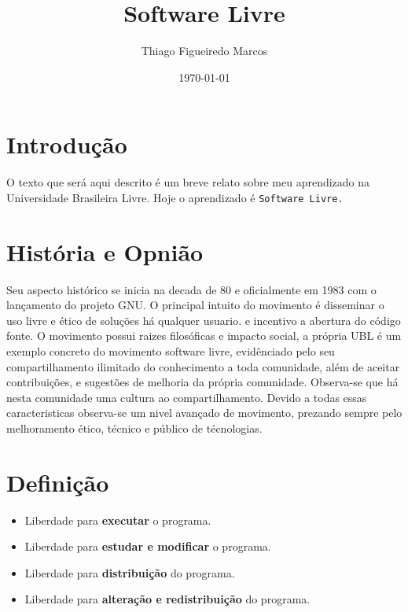 \documentclass[12pt, onecolumn]{report}
\title{Software Livre}
\author{Thiago Figueiredo Marcos}
\date{\today}
\begin{document}
    \maketitle

    \tableofcontents

    \chapter{Introdução}
        \hspace{2cm} O texto que será aqui descrito é um breve relato sobre meu aprendizado na Universidade Brasileira Livre.
            Hoje o aprendizado é {\tt Software Livre.}

    \chapter{História e Opnião}
        \hspace{2cm} Seu aspecto histórico se inicia na decada de 80 e oficialmente em 1983 com o lançamento do projeto GNU.
            O principal intuito do movimento é disseminar o uso livre e ético de soluções há qualquer usuario. 
            e incentivo a abertura do código fonte. O movimento possui raizes filosóficas e impacto social, a própria UBL é um 
            exemplo concreto do movimento software livre, evidênciado pelo seu compartilhamento ilimitado do conhecimento a toda comunidade,
            além de aceitar contribuições, e sugestões de melhoria da própria comunidade. Observa-se que há nesta comunidade uma cultura ao compartilhamento.
            Devido a todas essas caracteristicas observa-se um nivel avançado de movimento, prezando sempre pelo melhoramento ético, técnico e público de técnologias.        
    
    \chapter{Definição}
        \begin{itemize}
            \item Liberdade para {\bf executar} o programa.
            \item Liberdade para {\bf estudar e modificar} o programa.
            \item Liberdade para {\bf distribuição} do programa.
            \item Liberdade para {\bf alteração e redistribuição} do programa.
        \end{itemize}
\end{document}
